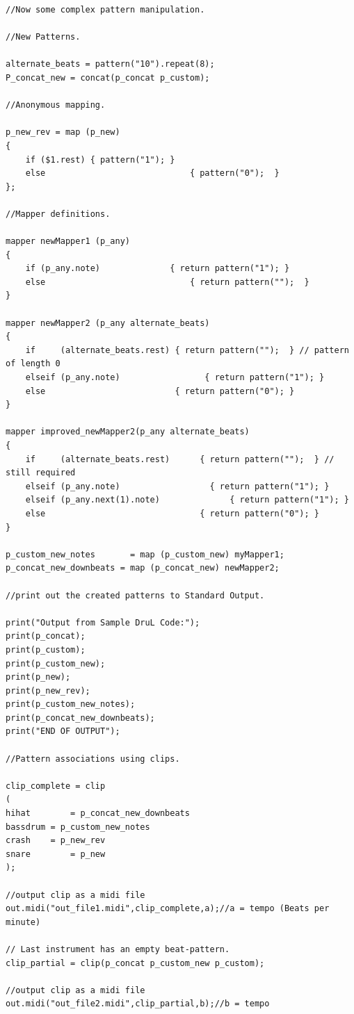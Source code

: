 \documentclass[11pt,twoside]{article}
\begin{document}
\begin{verbatim}
//Now some complex pattern manipulation.

//New Patterns.

alternate_beats = pattern("10").repeat(8);
P_concat_new = concat(p_concat p_custom);

//Anonymous mapping.

p_new_rev = map (p_new)
{
    if ($1.rest) { pattern("1"); }
    else 					         { pattern("0");  }
};

//Mapper definitions. 

mapper newMapper1 (p_any)
{
    if (p_any.note) 			 { return pattern("1"); }
    else         					 { return pattern("");  }
}

mapper newMapper2 (p_any alternate_beats)
{
    if     (alternate_beats.rest) { return pattern("");  } // pattern of length 0
    elseif (p_any.note)   				{ return pattern("1"); }
    else                          { return pattern("0"); }
}

mapper improved_newMapper2(p_any alternate_beats)
{
    if     (alternate_beats.rest)      { return pattern("");  } // still required
    elseif (p_any.note)		             { return pattern("1"); }
    elseif (p_any.next(1).note)				 { return pattern("1"); }
    else                               { return pattern("0"); }
}

p_custom_new_notes 		 = map (p_custom_new) myMapper1;
p_concat_new_downbeats = map (p_concat_new) newMapper2;

//print out the created patterns to Standard Output.

print("Output from Sample DruL Code:");
print(p_concat);
print(p_custom);
print(p_custom_new);
print(p_new);
print(p_new_rev);
print(p_custom_new_notes);
print(p_concat_new_downbeats);
print("END OF OUTPUT");

//Pattern associations using clips.

clip_complete = clip
(
hihat		 = p_concat_new_downbeats
bassdrum = p_custom_new_notes
crash 	 = p_new_rev
snare		 = p_new
);

//output clip as a midi file
out.midi("out_file1.midi",clip_complete,a);//a = tempo (Beats per minute)

// Last instrument has an empty beat-pattern.
clip_partial = clip(p_concat p_custom_new p_custom);

//output clip as a midi file
out.midi("out_file2.midi",clip_partial,b);//b = tempo
\end{verbatim}
\end{document}
